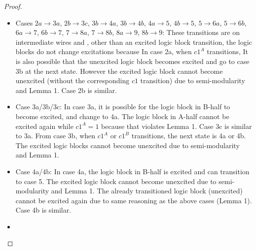 \documentclass[12pt]{report}
\begin{document}
\begin{proof}
\begin{itemize}
\item
Cases $2a\rightarrow 3a$, $2b\rightarrow 3c$, $3b\rightarrow 4a$, $3b\rightarrow 4b$, $4a\rightarrow 5$, $4b\rightarrow 5$, $5\rightarrow 6a$, $5\rightarrow 6b$, $6a\rightarrow 7$, $6b\rightarrow 7$, $7\rightarrow 8a$, $7\rightarrow 8b$, $8a\rightarrow 9$, $8b\rightarrow 9$:  
These transitions are on intermediate wires and , other than an excited logic block transition, the logic blocks do not change excitations because  
In case 2a, when $c1^A$ transitions, 
It is also possible that the unexcited logic block becomes excited and go to case 3b at the next state.  However the excited logic block cannot become unexcited (without the corresponding $c1$ transition) due to semi-modularity and Lemma 1.  Case 2b is similar.
\item
Case 3a/3b/3c:  In case 3a, it is possible for the logic block in B-half to become excited, and change to 4a.  The logic block in A-half cannot be excited again while $c1^A=1$ because that violates Lemma 1.  Case 3c is similar to 3a.  From case 3b, when $c1^A$ or $c1^B$ transitions, the next state is 4a or 4b.  The excited logic blocks cannot become unexcited due to semi-modularity and Lemma 1.
\item
Case 4a/4b:
In case 4a, the logic block in B-half is excited and can transition to case 5.  The excited logic block cannot become unexcited due to semi-modularity and Lemma 1.  The already transitioned logic block (unexcited) cannot be excited again due to same reasoning as the above cases (Lemma 1).  Case 4b is similar.
\item

\end{itemize}
\end{proof}
\end{document}
